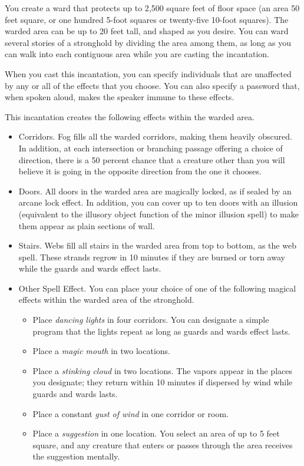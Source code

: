 You create a ward that protects up to 2,500 square feet of floor space (an area 50 feet square, or one hundred 5-foot squares or twenty-five 10-foot squares). The warded area can be up to 20 feet tall, and shaped as you desire. You can ward several stories of a stronghold by dividing the area among them, as long as you can walk into each contiguous area while you are casting the incantation.

When you cast this incantation, you can specify individuals that are unaffected by any or all of the effects that you choose. You can also specify a password that, when spoken aloud, makes the speaker immune to these effects.

This incantation creates the following effects within the warded area.
\begin{itemize}
    \item Corridors. Fog fills all the warded corridors, making them heavily obscured. In addition, at each intersection or branching passage offering a choice of direction, there is a 50 percent chance that a creature other than you will believe it is going in the opposite direction from the one it chooses.
    \item Doors. All doors in the warded area are magically locked, as if sealed by an arcane lock effect. In addition, you can cover up to ten doors with an illusion (equivalent to the illusory object function of the minor illusion spell) to make them appear as plain sections of wall.
    \item Stairs. Webs fill all stairs in the warded area from top to bottom, as the web spell. These strands regrow in 10 minutes if they are burned or torn away while the guards and wards effect lasts.
    \item Other Spell Effect. You can place your choice of one of the following magical effects within the warded area of the stronghold.
    \begin{itemize}    
        \item Place \textit{dancing lights} in four corridors. You can designate a simple program that the lights repeat as long as guards and wards effect lasts.
        \item Place a \textit{magic mouth} in two locations.
        \item Place a \textit{stinking cloud} in two locations. The vapors appear in the places you designate; they return within 10 minutes if dispersed by wind while guards and wards lasts.
        \item Place a constant \textit{gust of wind} in one corridor or room.
        \item Place a \textit{suggestion} in one location. You select an area of up to 5 feet square, and any creature that enters or passes through the area receives the suggestion mentally.
    \end{itemize}
\end{itemize}

